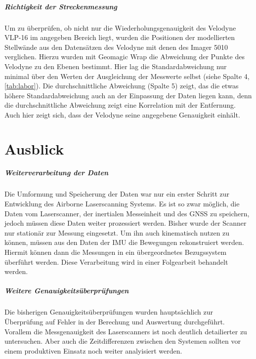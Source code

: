 \documentclass[a4paper,12pt,bibliography=totoc, listof=totoc,titlepage,pointlessnumbers]{scrreprt}
\begin{document}
\paragraph{Richtigkeit der Streckenmessung}
Um zu überprüfen, ob nicht nur die Wiederholungsgenauigkeit des Velodyne VLP-16 im angegeben Bereich liegt, wurden die Positionen der modellierten Stellwände aus den Datensätzen des Velodyne mit denen des Imager 5010 verglichen. Hierzu wurden mit Geomagic Wrap die Abweichung der Punkte des Velodyne zu den Ebenen bestimmt. Hier lag die Standardabweichung nur minimal über den Werten der Ausgleichung der Messwerte selbst (siehe Spalte 4, \autoref{tab:labor}). Die durchschnittliche Abweichung (Spalte 5) zeigt, das die etwas höhere Standardabweichung auch an der Einpassung der Daten liegen kann, denn die durchschnittliche Abweichung zeigt eine Korrelation mit der Entfernung. Auch hier zeigt sich, dass der Velodyne seine angegebene Genauigkeit einhält.

\chapter{Ausblick}
\label{c:ausblick}

\paragraph{Weiterverarbeitung der Daten}
Die Umformung und Speicherung der Daten war nur ein erster Schritt zur Entwicklung des Air\-borne Laser\-scan\-ning Systems. Es ist so zwar möglich, die Daten vom Laser\-scan\-ner, der inertialen Messeinheit und des GNSS zu speichern, jedoch müssen diese Daten weiter prozessiert werden. Bisher wurde der Scanner nur stationär zur Messung eingesetzt. Um  ihn auch kinematisch nutzen zu können, müssen aus den Daten der IMU die Bewegungen rekonstruiert werden. Hiermit können dann die Messungen in ein übergeordnetes Bezugssystem überführt werden. Diese Verarbeitung wird in einer Folgearbeit behandelt werden.

\paragraph{Weitere Genauigkeitsüberprüfungen}
Die bisherigen Genauigkeitsüberprüfungen wurden hauptsächlich zur Überprüfung auf Fehler in der Berechung und Auswertung durchgeführt. Vorallem die Messgenauigkeit des Laserscanners ist noch deutlich detailierter zu untersuchen. Aber auch die Zeitdifferenzen zwischen den Systemen sollten vor einem produktiven Einsatz noch weiter analyisiert werden.
\end{document}
